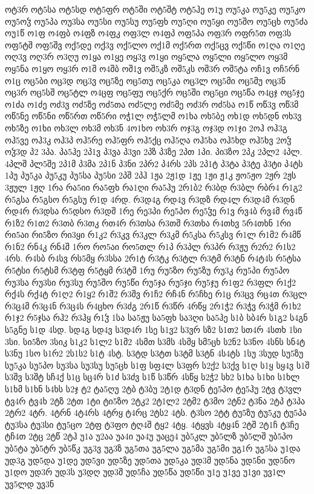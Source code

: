 {ოტ3რ
ოტ5სა
ოტ5სდ
ოტ5ფრ
ოტ5ში
ოტ5შტ
ოტ5ჰე
ო1უ
ოუ5კა
ოუ5კე
ოუ5კო
ოუ5ოჴ
ოუ5პა
ოუ3სა
ოუ5სი
ოუ5სუ
ოუ5ფხ
ოუ5ღი
ოუ5ყი
ოუ5შო
ოუ5ცხ
ოუ5ძა
ოუ1წ
ო1ფ
ო4ფბ
ო4ფზ
ო4ფკ
ოფ3ლ
ო4ფპ
ოფ5პა
ოფ3რ
ოფრ5თ
ოფ3ს
ოფ5ტშ
ოფ5შვ
ოქ5დე
ოქ3ვ
ოქ5ლო
ოქ1მ
ოქ5რთ
ოქ5ცვ
ოქ5წი
ო1ღა
ო1ღე
ოღ3ვ
ოღ3რ
ო3ღუ
ო1ყა
ო1ყე
ოყ3ვ
ო1ყი
ოყ5ლა
ოყ5ლი
ოყ5ლო
ოყ3მ
ოყ5ნა
ო1ყო
ოყ3რ
ო1შ
ო4შბ
ოშ1ვ
ოშ5კზ
ოშ5კს
ოშ3რ
ოშ5ტა
ოჩ1ვ
ოჩ5რნ
ო1ც
ოც5ბი
ოც3დ
ოც3ვ
ოც5ზე
ოც5თუ
ოც5კა
ოც3ლ
ოც5მი
ოც5მუ
ოც3ნ
ოც3რ
ოც5სშ
ოც5ტლ
ო4ცფ
ოც5ფუ
ოც5ქრ
ოც5ში
ოც5ცი
ოც5წა
ო4ცჯ
ოც5ჯე
ო1ძა
ო1ძე
ოძ3ვ
ოძ5ზე
ოძ5თა
ოძ5ლე
ოძ5მე
ოძ3რ
ოძ5სა
ო1წ
ოწ3ვ
ოწ3მ
ოწ5ნე
ოწ5ნი
ოწ5რთ
ოწ5რი
ოჭ1ლ
ოჭ5ლმ
ო1ხა
ოხ5ბე
ოხ1დ
ოხ5დნ
ოხ3ვ
ოხ5ზე
ო1ხი
ოხ3ლ
ოხ3მ
ოხ3ნ
4ო1ხო
ოხ3რ
ოჯ3გ
ოჯ3დ
ო1ჯი
2ოჰ
ოჰ3გ
ოჰ5ვე
ოჰ3კ
ოჰ3პ
ოჰ5რე
ოჰ5ფრ
ოჰ5ქც
ოჰ5ღა
ოჰ5ხა
ოჰ5ხდ
ოჰ5ხვ
2ოჴ
ოჴ3დ
პ2
3პა.
პა5ჰე
2პ1ვ
პ3ვა
პ3ვი
2პზ
პ3ზე
2პთ
1პი.
პი3ზო
2პკ
2პლ2
4პლ.
4პლშ
პლ5შე
2პ1მ
პ3მა
2პ1ნ
პ3ნი
2პრ2
პ4რს
2პს
2პ1ტ
პ3ტა
პ3ტე
პ3ტი
პ4ტს
1პუ
პუ5კა
პუ5კუ
პუ5სა
პუ5სი
2პშ
2პჰ
1ჟა
2ჟ1დ
1ჟე
1ჟი
ჟ1კ
ჟო5ჟო
2ჟრ
2ჟს
3ჟულ
1ჟღ
1რა
რა5იი
რა5ფხ
რა1ღი
რა5ჰუ
2რ1ბ2
რ3ბდ
რ3ბლ
რბრ4
რ1გ2
რ5გსა
რ5გსო
რ5გსუ
რ1დ
4რდ.
რ3დ4გ
რდ4ვ
რ3დზ
რდ4ლ
რ3დ4მ
რ3დნ
რდ4რ
რ3დსა
რ5დსო
რ3დშ
1რე
რე3პი
რე5პო
რე5ჴე
რ1ვ
რვ4ბ
რვ4მ
რვ4წ
რ1ზ2
რ1თ2
რ3თბ
რ3თკ
რთ4რ
რ3თსა
რ3თშ
რ3თხა
რ4თხვ
5რ4თხნ
1რი
რი5აი
რი5ზო
რი3ყი
რ1კ2
რ3კვ
რ3კლ
რ3კმ
რ5კსა
რ5კსვ
რ1ლ
რ1მ2
რ4მწ
რ1ნ2
რნ4კ
რნ4შ
1რო
რო5აი
რო5თლ
რ1პ
რ3პლ
რ3პრ
რ3ჟუ
რ2რ2
რ1ს2
4რს.
რ4სბ
რ4სვ
რს5მყ
რ3სსა
2რ1ტ
რ3ტკ
რ3ტლ
რ3ტმ
რ3ტნ
რ4ტ4ს
რ5ტსა
რ5ტსი
რ5ტსმ
რ3ტფ
რ5ტყმ
რ3ტშ
1რუ
რუ5ზო
რუ5ზუ
რუ3კ
რუ5პი
რუ5პო
რუ3სა
რუ3სი
რუ3სუ
რუ5შო
რუ5წი
რუ5ჯა
რუ5ჯი
რუ5ჯუ
რ1ფ2
რ3ფლ
რ1ქ2
რქ4ს
რქ4ტ
რ1ღ2
რ1ყ2
რ1შ2
რ3შვ
რ1ჩ2
რჩ4ნ
რ5ჩხე
რ1ც
რ3ცვ
რც4თ
რ3ცლ
რ3ც4მ
რ3ც4ნ
რ3ც4ს
რ4ცხო
რ3ძგ
2რ1წ
რ3წრ
4რწყ
2რ1ჭ2
რ3ჭვ
რ3ჭმ
რ1ხ2
რ1ჯ2
რ5ჯსა
რჰ2
რ3ჰყ
რ1ჴ
1სა
სა5ჟუ
სა5ფხ
სა3ღი
სა5ჰე
ს1ბ
სბ4რ
ს1გ2
ს4გნ
ს5გნე
ს1დ
4სდ.
სდ4გ
სდ4ვ
ს3დ4რ
1სე
ს1ვ2
ს3ვრ
სზ2
ს1თ2
სთ4რ
4სთხ
1სი
3სი.
სი5ზო
3სიკ
ს1კ2
ს1ლ2
ს1მ2
4სმთ
ს3მს
4სმყ
სმ5ცხ
ს2ნ2
ს3ნო
4სნს
სნ4ტ
ს3ნუ
1სო
ს1რ2
2ს1ს2
ს1ტ
4სტ.
ს3ტდ
ს3ტთ
ს3ტმ
ს3ტნ
4ს4ტს
1სუ
3სუდ
სუ5ზუ
სუ5კა
სუ5პო
სუ3სა
სუ3სუ
სუ5ცხ
ს1ფ
სფ4ლ
ს3ფრ
ს2ქ2
ს3ქვ
ს1ღ
ს1ყ
სყ4ვ
ს1შ
ს3შვ
ს3შტ
სჩ4ქ
ს1ც
სც4რ
ს1ძ
ს3ძვ
ს1წ
ს3წრ
4სწყ
ს2ჭ2
სხ2
ს1ხა
ს1ხი
ს1ხლ
ს1ხმ
ს1ხნ
ს4ხს
ს2ჯ
ტ2
ტა5ღუ
2ტბ
ტ3ბუ
2ტ1დ
ტ3დნ
ტე5პო
ტე5ჰუ
2ტვ
ტ3ვლ
ტვ4რ
ტვ4ხ
2ტზ
2ტთ
1ტი
ტი5ზო
2ტკ2
2ტ1ლ2
2ტმ2
ტ3მო
2ტნ2
ტ3ნა
2ტპ
ტ3პა
2ტრ2
4ტრ.
4ტრნ
4ტ4რს
4ტრყ
ტ4რც
2ტს2
4ტს.
ტ3სო
2ტტ
ტუ5ზუ
ტუ5კუ
ტუ5პა
ტუ3სა
ტუ3სი
ტუ5ცო
2ტფ
ტ3ფო
ტღ4შ
ტყ2
4ტყ.
4ტყვს
4ტყ4ნ
2ტშ
2ტ1ჩ
ტ3ჩე
ტჩ4თ
2ტც
2ტწ
2ტჰ
უ1ა
უ2აა
უა4ი
უა4უ
უაცე4
უბ5კლ
უბ5ლზ
უბ5ლშ
უბ5პო
უბ5ტა
უბ5ტრ
უბ5წკ
უგ3ვ
უგ3ზ
უგ5თა
უგ5ლა
უგ5მა
უგ5მი
უგ1რ
უგ5სა
უ1და
უდ3გ
უდ5და
უ1დე
უდ5ვი
უდ5ზე
უდ5თა
უდ5კა
უდ3მ
უდ5ნა
უდ5ნი
უდ5ნო
უ1დო
უდ3რ
უდ3ს
უ3დღ
უდ3შ
უდ5ჩა
უდ5წა
უდ5წი
უ1ე
უ1ვე
უ1ვი
უვ1ლ
უვ5ლდ
უვ3ნ
}
